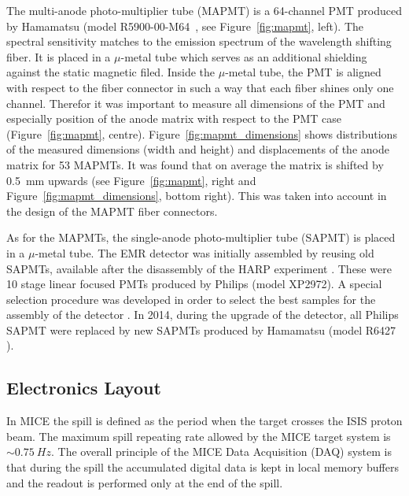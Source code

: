 \documentclass[a4paper,11pt]{article}
\begin{document}
The multi-anode photo-multiplier tube (MAPMT) is a 64-channel PMT produced by Hamamatsu (model R5900-00-M64~\cite{hamamatsu_mapmt}, see
Figure~\ref{fig:mapmt}, left). The spectral sensitivity matches to the emission spectrum of the wavelength shifting fiber. It is 
placed in a $\mu$-metal tube  which serves as an additional shielding against the static magnetic filed. Inside the $\mu$-metal tube,
the PMT is aligned with respect to the fiber connector in such a way that each fiber shines only one
channel. Therefor it was important to measure all dimensions of the PMT and especially position of the anode matrix with respect to the
PMT case (Figure~\ref{fig:mapmt}, centre). Figure~\ref{fig:mapmt_dimensions} shows distributions of the measured dimensions (width and
height) and displacements of the anode matrix for 53 MAPMTs. It was found that on average the matrix is shifted by 0.5~mm upwards (see
Figure~\ref{fig:mapmt}, right and Figure~\ref{fig:mapmt_dimensions}, bottom right). This was taken into account in the design of the
MAPMT fiber connectors.

As for the MAPMTs, the single-anode photo-multiplier tube (SAPMT) is placed in a $\mu$-metal tube. The EMR detector was initially assembled
by reusing old SAPMTs, available after the disassembly of the HARP experiment \cite{harp}. These were 10 stage linear focused PMTs produced
by Philips (model XP2972). A special selection procedure was developed in order to select the best samples for the assembly of the detector
\cite{philips}. In 2014, during the upgrade of the detector, all Philips SAPMT were replaced by new SAPMTs produced by Hamamatsu (model R6427
\cite{hamamatsu_mapmt}).

\subsection{Electronics Layout}
In MICE the spill is defined as the period when the target crosses the ISIS proton beam. The maximum spill repeating rate allowed by the
MICE target system is $\sim 0.75 \ Hz$. The overall principle of the MICE Data Acquisition (DAQ) system is that during the spill the
accumulated digital data is kept in local memory buffers and the readout is performed only at the end of the spill.
\end{document}
